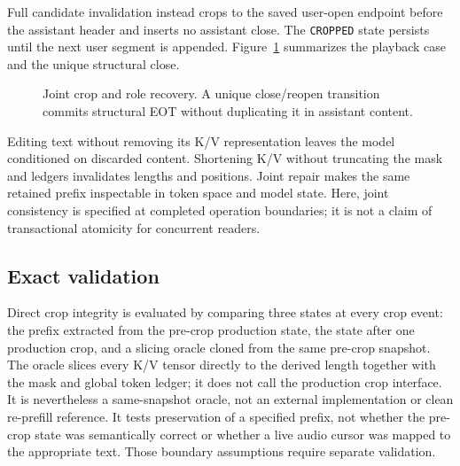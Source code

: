 Full candidate invalidation instead crops to the saved user-open endpoint before the assistant header and inserts no assistant close. The \texttt{CROPPED} state persists until the next user segment is appended. Figure~\ref{fig:state-repair} summarizes the playback case and the unique structural close.

\begin{figure}[t]
\centering
{}
\caption{Joint crop and role recovery. A unique close/reopen transition commits structural EOT without duplicating it in assistant content.}
\label{fig:state-repair}
\end{figure}

Editing text without removing its K/V representation leaves the model conditioned on discarded content. Shortening K/V without truncating the mask and ledgers invalidates lengths and positions. Joint repair makes the same retained prefix inspectable in token space and model state. Here, joint consistency is specified at completed operation boundaries; it is not a claim of transactional atomicity for concurrent readers.

\subsection{Exact validation}

Direct crop integrity is evaluated by comparing three states at every crop event: the prefix extracted from the pre-crop production state, the state after one production crop, and a slicing oracle cloned from the same pre-crop snapshot. The oracle slices every K/V tensor directly to the derived length together with the mask and global token ledger; it does not call the production crop interface. It is nevertheless a same-snapshot oracle, not an external implementation or clean re-prefill reference. It tests preservation of a specified prefix, not whether the pre-crop state was semantically correct or whether a live audio cursor was mapped to the appropriate text. Those boundary assumptions require separate validation.

